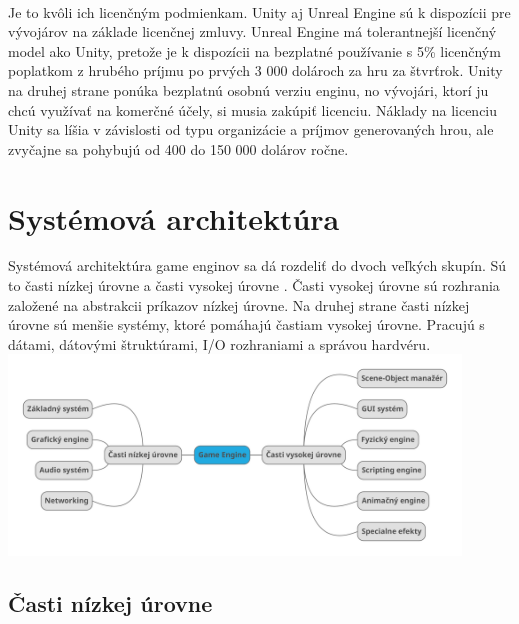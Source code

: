 \documentclass[10pt,oneside,slovak,a4paper,hidelinks]{article}
\begin{document}
		\paragraph{}Je to kvôli ich licenčným podmienkam. Unity aj Unreal Engine sú k dispozícii pre vývojárov na základe licenčnej zmluvy. Unreal Engine má tolerantnejší licenčný model ako Unity, pretože je k dispozícii na bezplatné používanie s 5\% licenčným poplatkom z hrubého príjmu po prvých 3 000 dolároch za hru za štvrťrok. Unity na druhej strane ponúka bezplatnú osobnú verziu enginu, no vývojári, ktorí ju chcú využívať na komerčné účely, si musia zakúpiť licenciu. Náklady na licenciu Unity sa líšia v závislosti od typu organizácie a príjmov generovaných hrou, ale zvyčajne sa pohybujú od 400 do 150 000 dolárov ročne.
	\section{Systémová architektúra}
		Systémová architektúra game enginov sa dá rozdeliť do dvoch veľkých skupín. Sú to časti nízkej úrovne a časti vysokej úrovne \cite{Primary}. Časti vysokej úrovne sú rozhrania založené na abstrakcii príkazov nízkej úrovne. Na druhej strane časti nízkej úrovne sú menšie systémy, ktoré pomáhajú častiam vysokej úrovne. Pracujú s dátami, dátovými štruktúrami, I/O rozhraniami a správou hardvéru.
		\includegraphics[width=12cm]{sys_arch}
	\subsection{Časti nízkej úrovne}
\end{document}
